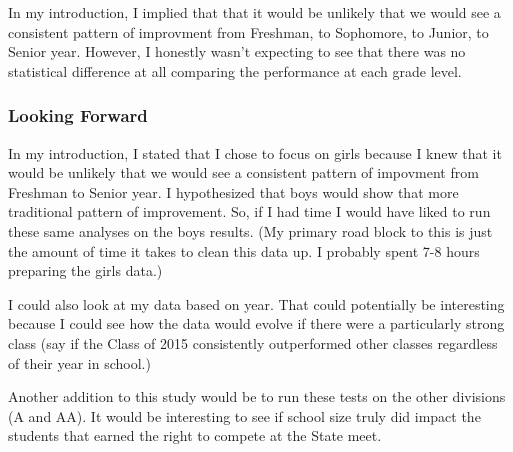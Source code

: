 \documentclass[
]{article}
\begin{document}
In my introduction, I implied that that it would be unlikely that we
would see a consistent pattern of improvment from Freshman, to
Sophomore, to Junior, to Senior year. However, I honestly wasn't
expecting to see that there was no statistical difference at all
comparing the performance at each grade level.

\hypertarget{looking-forward}{%
\subsubsection{Looking Forward}\label{looking-forward}}

In my introduction, I stated that I chose to focus on girls because I
knew that it would be unlikely that we would see a consistent pattern of
impovment from Freshman to Senior year. I hypothesized that boys would
show that more traditional pattern of improvement. So, if I had time I
would have liked to run these same analyses on the boys results. (My
primary road block to this is just the amount of time it takes to clean
this data up. I probably spent 7-8 hours preparing the girls data.)

I could also look at my data based on year. That could potentially be
interesting because I could see how the data would evolve if there were
a particularly strong class (say if the Class of 2015 consistently
outperformed other classes regardless of their year in school.)

Another addition to this study would be to run these tests on the other
divisions (A and AA). It would be interesting to see if school size
truly did impact the students that earned the right to compete at the
State meet.
\end{document}
